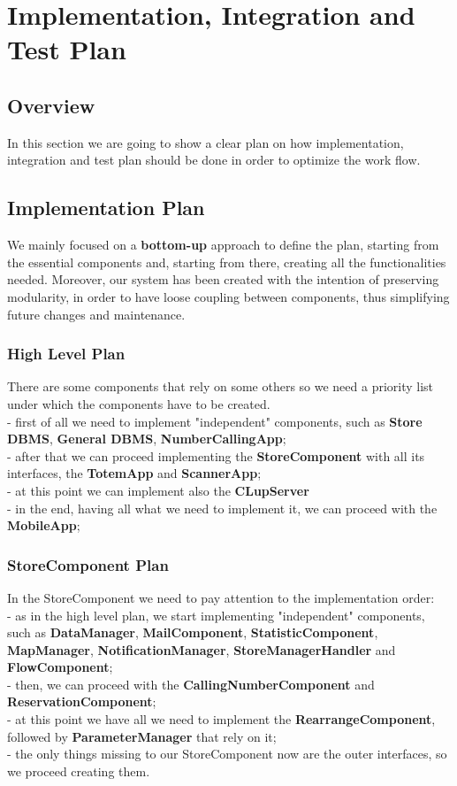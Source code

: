 \documentclass{article}
\begin{document}
\section{Implementation, Integration and Test Plan}
	\subsection{Overview}
	In this section we are going to show a clear plan on how implementation, integration and test plan should be done in order to optimize the work flow.
	
	\subsection{Implementation Plan}
	We mainly focused on a \textbf{bottom-up} approach to define the plan, starting from the essential components and, starting from there, creating all the functionalities needed. Moreover, our system has been created with the intention of preserving modularity, in order to have loose coupling between components, thus simplifying future changes and maintenance.
	
		\subsubsection{High Level Plan}
		There are some components that rely on some others so we need a priority list under which the components have to be created.\\
		- first of all we need to implement "independent" components, such as \textbf{Store DBMS}, \textbf{General DBMS}, \textbf{NumberCallingApp};\\
		- after that we can proceed implementing the \textbf{StoreComponent} with all its interfaces, the \textbf{TotemApp} and \textbf{ScannerApp};\\
		- at this point we can implement also the \textbf{CLupServer}\\
		- in the end, having all what we need to implement it, we can proceed with the \textbf{MobileApp};\\
		
		\subsubsection{StoreComponent Plan}
		In the StoreComponent we need to pay attention to the implementation order:\\
		- as in the high level plan, we start implementing "independent" components, such as \textbf{DataManager}, \textbf{MailComponent}, \textbf{StatisticComponent}, \textbf{MapManager}, \textbf{NotificationManager}, \textbf{StoreManagerHandler} and \textbf{FlowComponent};\\
		- then, we can proceed with the \textbf{CallingNumberComponent} and \textbf{ReservationComponent};\\
		- at this point we have all we need to implement the \textbf{RearrangeComponent}, followed by \textbf{ParameterManager} that rely on it;\\
		- the only things missing to our StoreComponent now are the outer interfaces, so we proceed creating them.\\
		
\end{document}
